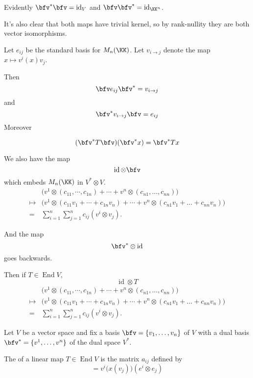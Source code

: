 \documentclass{article}
\DeclareMathOperator{\End}{End}
\DeclareMathOperator{\id}{id}
\begin{document}
Evidently $\bfv^\ast \bfv = \id_V$ and $\bfv \bfv^\ast = \id_{\KK^n}$.

It's also clear that both maps have trivial kernel, so by rank-nullity they are both vector isomorphisms.

Let $e_{ij}$ be the standard basis for $M_n(\KK)$.
Let $v_{i\to j}$ denote the map $x \mapsto v^i(x)v_j$.

Then
\[
    \bfv e_{ij} \bfv^\ast
    =
    v_{i \to j}
\]
and
\[
    \bfv^\ast v_{i \to j} \bfv
    =
    e_{ij}
\]
Moreover

\begin{proposition}
    \[
        (\bfv^\ast T \bfv)
        (\bfv^\ast x)
        =
        \bfv^\ast Tx
    \]
\end{proposition}

We also have the map
\[
    \id \otimes \bfv
\]
which embeds $M_n(\KK)$ in $V^\ast \otimes V$.
\begin{align*}
    &\Big(
        v^1 \otimes (c_{11}, \cdots, c_{1n}) + \cdots + v^n \otimes (c_{n1}, \ldots, c_{nn})
    \Big)
    \\
    \mapsto
    &\Big(
        v^1 \otimes (c_{11}v_1 + \cdots + c_{1n}v_n) + \cdots + v^n \otimes (c_{n1}v_1 + \ldots + c_{nn}v_n)
    \Big)
    \\
    =
    &\sum_{i=1}^n
    \sum_{j=1}^n
    c_{ij} (v^i \otimes v_j).
\end{align*}

And the map
\[
    \bfv^\ast \otimes \id
\]
goes backwards.

Then if $T \in \End V$,
\[
    \id \otimes T
\]
\begin{align*}
    &\Big(
        v^1 \otimes (c_{11}, \cdots, c_{1n}) + \cdots + v^n \otimes (c_{n1}, \ldots, c_{nn})
    \Big)
    \\
    \mapsto
    &\Big(
        v^1 \otimes (c_{11}v_1 + \cdots + c_{1n}v_n) + \cdots + v^n \otimes (c_{n1}v_1 + \ldots + c_{nn}v_n)
    \Big)
    \\
    =
    &\sum_{i=1}^n
    \sum_{j=1}^n
    c_{ij} (v^i \otimes v_j).
\end{align*}
\begin{definition}
    Let $V$ be a vector space and fix a basis $\bfv = \{v_1,\ldots,v_n\}$ of $V$ with a dual basis $\bfv^\ast = \{v^1, \ldots, v^n\}$ of the dual space $V^\ast$.

    The  of a linear map $T \in \End V$ is the matrix $a_{ij}$ defined by
    \[
        =
        v^i\Big(x(v_j)\Big)
        (e^i \otimes e_j)
    \]
\end{definition}
\end{document}
